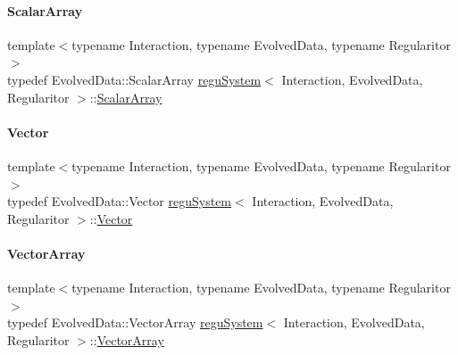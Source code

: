 \mbox{\label{classregu_system_a90aade4ee474e3c49df3551515d5e7ef}} 
\paragraph{\texorpdfstring{Scalar\+Array}{ScalarArray}}
{\footnotesize\ttfamily template$<$typename Interaction, typename Evolved\+Data, typename Regularitor$>$ \\
typedef Evolved\+Data\+::\+Scalar\+Array \mbox{\hyperlink{classregu_system}{regu\+System}}$<$ Interaction, Evolved\+Data, Regularitor $>$\+::\mbox{\hyperlink{classregu_system_a90aade4ee474e3c49df3551515d5e7ef}{Scalar\+Array}}}

\mbox{\label{classregu_system_a809e01e54818f87ef4cdd47953db9e7d}} 
\paragraph{\texorpdfstring{Vector}{Vector}}
{\footnotesize\ttfamily template$<$typename Interaction, typename Evolved\+Data, typename Regularitor$>$ \\
typedef Evolved\+Data\+::\+Vector \mbox{\hyperlink{classregu_system}{regu\+System}}$<$ Interaction, Evolved\+Data, Regularitor $>$\+::\mbox{\hyperlink{classregu_system_a809e01e54818f87ef4cdd47953db9e7d}{Vector}}}

\mbox{\label{classregu_system_aa4ecefb5c437230b994171e231450be8}} 
\paragraph{\texorpdfstring{Vector\+Array}{VectorArray}}
{\footnotesize\ttfamily template$<$typename Interaction, typename Evolved\+Data, typename Regularitor$>$ \\
typedef Evolved\+Data\+::\+Vector\+Array \mbox{\hyperlink{classregu_system}{regu\+System}}$<$ Interaction, Evolved\+Data, Regularitor $>$\+::\mbox{\hyperlink{classregu_system_aa4ecefb5c437230b994171e231450be8}{Vector\+Array}}}



